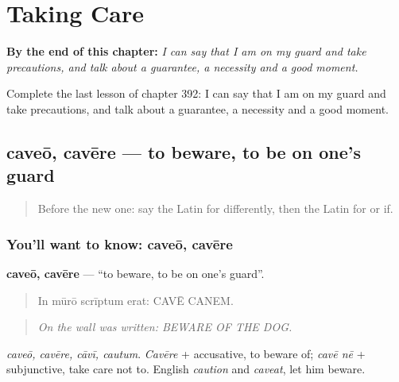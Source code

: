 
\chapter{Taking Care}
\label{ch:la-taking-care}

\begin{chapteropening}
\textbf{By the end of this chapter:} \emph{I can say that I am on my guard and take precautions, and talk about a guarantee, a necessity and a good moment.}

Complete the last lesson of chapter 392: I can say that I am on my guard and take precautions, and talk about a guarantee, a necessity and a good moment.
\end{chapteropening}

\section[caveō, cavēre]{caveō, cavēre — to beware, to be on one's guard}

\label{lesson:LA-C392-caveo}



\begin{quote}
Before the new one: say the Latin for differently, then the Latin for or if.
\end{quote}

\subsection*{You'll want to know: caveō, cavēre}
\textbf{caveō, cavēre} — \textquotedblleft{}to beware, to be on one's guard\textquotedblright{}.

\begin{quote}
In mūrō scrīptum erat: CAVĒ CANEM.
\end{quote}

\begin{quote}
\emph{On the wall was written: BEWARE OF THE DOG.}
\end{quote}

\emph{caveō, cavēre, cāvī, cautum}. \emph{Cavēre} + accusative, to beware of; \emph{cavē nē} + subjunctive, take care not to. English \emph{caution} and \emph{caveat}, let him beware.

